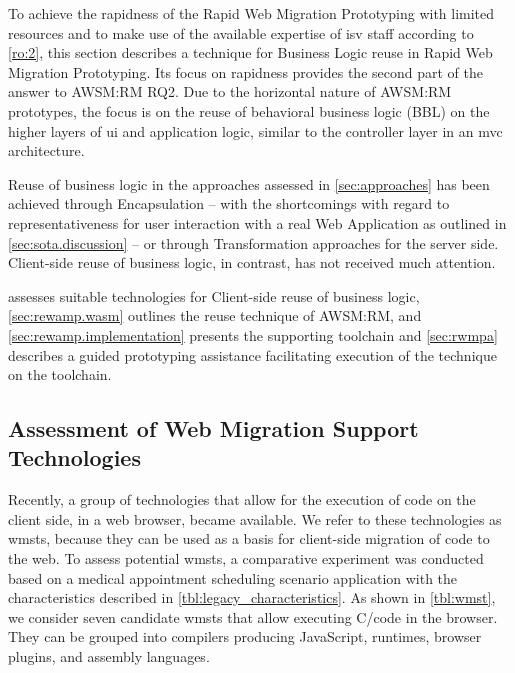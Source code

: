 To achieve the rapidness of the \gls{Rapid Web Migration Prototyping} with limited resources and to make use of the available expertise of \gls{isv} staff according to \cref{ro:2}, this section describes a technique for Business Logic reuse in \gls{Rapid Web Migration Prototyping}.
Its focus on rapidness provides the second part of the answer to AWSM:RM RQ2.
Due to the horizontal nature of AWSM:RM prototypes, the focus is on the reuse of behavioral business logic (BBL) on the higher layers of \gls{ui} and application logic, similar to the controller layer in an \gls{mvc} architecture.

Reuse of business logic in the approaches assessed in \cref{sec:approaches} has been achieved through \gls{Encapsulation} -- with the shortcomings with regard to representativeness for user interaction with a real \gls{Web Application} as outlined in \cref{sec:sota.discussion} -- or through \gls{Transformation} approaches for the server side.
Client-side reuse of business logic, in contrast, has not received much attention.

 assesses suitable technologies for Client-side reuse of business logic, \cref{sec:rewamp.wasm} outlines the reuse technique of AWSM:RM, and \cref{sec:rewamp.implementation} presents the supporting toolchain and \cref{sec:rwmpa} describes a guided prototyping assistance facilitating execution of the technique on the toolchain.

\vspace{-10pt}
\hypertarget{sec:wmst}{%
\subsection[Web Migration Support Technology Assessment]{Assessment of Web Migration Support Technologies}\label{sec:wmst}}
\vspace{10pt}

Recently, a group of technologies that allow for the execution of  code on the client side, in a \gls{web} browser, became available.
We refer to these technologies as \glspl{wmst}, because they can be used as a basis for client-side migration of  code to the \gls{web}.
To assess potential \glspl{wmst}, a comparative experiment was conducted based on a medical appointment scheduling scenario application with the characteristics described in \cref{tbl:legacy_characteristics}.
As shown in \cref{tbl:wmst}, we consider seven candidate \glspl{wmst} that allow executing  C/\cpp code in the browser.
They can be grouped into compilers producing JavaScript, runtimes, browser plugins, and assembly languages.


